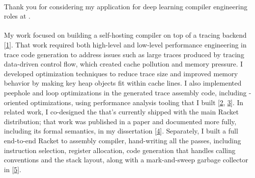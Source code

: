

\newcommand{\dissertationurl}{https://github.com/cderici/dissertation/releases/download/latest-pdf/thesis.pdf}
\newcommand{\pycketperfurl}{https://github.com/cderici/pycket-performance}
\newcommand{\tracedrawurl}{https://github.com/cderici/trace-draw}
\newcommand{\raxurl}{https://github.com/cderici/rax}
\newcommand{\icfpreporturl}{https://dl.acm.org/doi/10.1145/3341642}
\newcommand{\atwurl}{https://github.com/cderici/around-the-world-in-26-languages}
\newcommand{\homelaburl}{https://home.dericilab.live/homelab/}

\newcommand{\cairolang}{https://github.com/cderici/around-the-world-in-compilers/blob/main/langs/cairo/README.md}
\newcommand{\dublinlang}{https://github.com/cderici/around-the-world-in-compilers/blob/main/langs/dublin/README.md}
\newcommand{\edinlang}{https://github.com/cderici/around-the-world-in-compilers/blob/main/langs/edinburgh/README.md}





\paragraph{} %
Thank you for considering my application for deep learning compiler engineering roles at .

\paragraph{} %
My  work focused on building a self-hosting compiler on top of a tracing  backend [\href{\dissertationurl}{1}]. That work required both high-level and low-level performance engineering in trace code generation to address issues such as large traces produced by tracing data-driven control flow, which created cache pollution and memory pressure. I developed optimization techniques to reduce trace size and improved memory behavior by making key heap objects fit within  cache lines. I also implemented peephole and loop optimizations in the generated trace assembly code, including -oriented optimizations, using performance analysis tooling that I built [\href{\pycketperfurl}{2}, \href{\tracedrawurl}{3}]. In related work, I co-designed the  that's currently shipped with the main Racket distribution; that work was published in a paper and documented more fully, including its formal semantics, in my dissertation [\href{\icfpreporturl}{4}]. Separately, I built a full end-to-end Racket to  assembly compiler, hand-writing all the passes, including instruction selection, register allocation, code generation that handles calling conventions and the stack layout, along with a mark-and-sweep garbage collector in  [\href{\raxurl}{5}].


